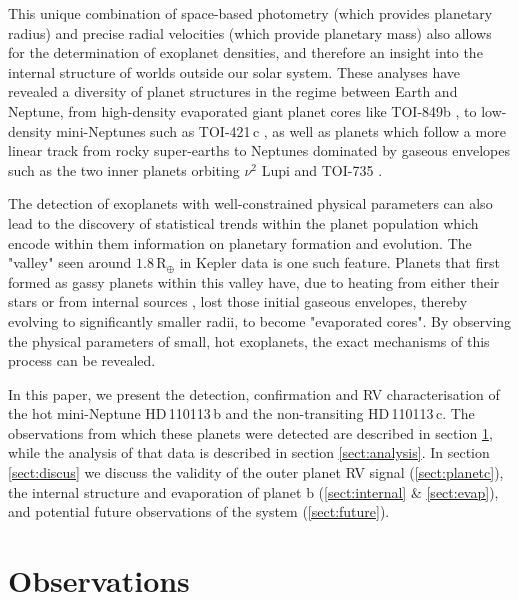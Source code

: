 \documentclass[fleqn,usenatbib]{mnras}
\newcommand{\gcm}{g\,cm$^{-3}$}	%
\newcommand{\rearth}{R$_{\oplus}$}
\newcommand{\Tplanet}{HD\,110113\,b}
\newcommand{\Tplanetc}{HD\,110113\,c}
\begin{document}
This unique combination of space-based photometry (which provides planetary radius) and precise radial velocities (which provide planetary mass) also allows for the determination of exoplanet densities, and therefore an insight into the internal structure of worlds outside our solar system.
These analyses have revealed a diversity of planet structures in the regime between Earth and Neptune, from high-density evaporated giant planet cores like TOI-849b \citep[5.2\,\gcm{}][]{armstrong2020remnant}, to low-density mini-Neptunes such as TOI-421\,c \citep{carleo2020multi}, as well as planets which follow a more linear track from rocky super-earths to Neptunes dominated by gaseous envelopes such as the two inner planets orbiting $\nu^2$ Lupi \citep{kane2020transits} and TOI-735 \citet{cloutier2020pair,nowak2020carmenes}.

The detection of exoplanets with well-constrained physical parameters can also lead to the discovery of statistical trends within the planet population which encode within them information on planetary formation and evolution.
The "valley" seen around $1.8$\,\rearth{} in Kepler data \citep{fulton2017california, van2018asteroseismic} is one such feature.
Planets that first formed as gassy planets within this valley have, due to heating from either their stars \citep[e.g. evaporation][]{owen2017evaporation} or from internal sources \citep[e.g. core-powered mass loss][]{ginzburg2018core}, lost those initial gaseous envelopes, thereby evolving to significantly smaller radii, to become "evaporated cores".
By observing the physical parameters of small, hot exoplanets, the exact mechanisms of this process can be revealed.

In this paper, we present the detection, confirmation and RV characterisation of the hot mini-Neptune \Tplanet{} and the non-transiting \Tplanetc{}. 
The observations from which these planets were detected are described in section \ref{sect:observations}, while the analysis of that data is described in section \ref{sect:analysis}.
In section \ref{sect:discus} we discuss the validity of the outer planet RV signal (\ref{sect:planetc}), the internal structure and evaporation of planet b (\ref{sect:internal} \& \ref{sect:evap}), and potential future observations of the system (\ref{sect:future}).

\section{Observations}
\label{sect:observations}
\end{document}
